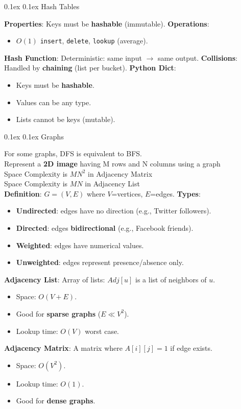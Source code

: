 \documentclass[8pt,landscape]{article}
\makeatletter
\renewcommand{\subsection}{\@startsection{subsection}{2}{0pt}%
    {0.1ex}%
    {0.1ex}%
    {\fontsize{8}{9}\bfseries\color{blue}}} %
\newcommand{\code}[1]{\textcolor{myred}{\texttt{#1}}}
\newcommand{\smalltext}[1]{%
  {\fontsize{8}{9}\selectfont\sloppy #1\par}%
}
\makeatother
\begin{document}
\begin{multicols}{3}
\subsection{Hash Tables}
\smalltext{
\textbf{Properties}: Keys must be \textbf{hashable} (immutable).
\textbf{Operations}:
\begin{itemize}[noitemsep, nolistsep, leftmargin=1em]
    \item $O(1)$ \code{insert}, \code{delete}, \code{lookup} (average).
\end{itemize}
\textbf{Hash Function}: Deterministic: same input $\to$ same output.
\textbf{Collisions}: Handled by \textbf{chaining} (list per bucket).
\textbf{Python Dict}:
\begin{itemize}[noitemsep, nolistsep, leftmargin=1em]
    \item Keys must be \textbf{hashable}.
    \item Values can be any type.
    \item Lists cannot be keys (mutable).
\end{itemize}
}

\subsection{Graphs}
\smalltext{
  For some graphs, DFS is equivalent to BFS. \\
  Represent a \textbf{2D image} having M rows and N columns using a graph \\
  Space Complexity is $MN^2$  in Adjacency Matrix\\
  Space Complexity is $MN$  in Adjacency List\\
\textbf{Definition}: $G=(V, E)$ where $V$=vertices, $E$=edges.
\textbf{Types}:
\begin{itemize}[noitemsep, nolistsep, leftmargin=1em]
    \item \textbf{Undirected}: edges have no direction (e.g., Twitter followers).
    \item \textbf{Directed}: edges \textbf{bidirectional} (e.g., Facebook friends).
    \item \textbf{Weighted}: edges have numerical values.
    \item \textbf{Unweighted}: edges represent presence/absence only.
\end{itemize}
\textbf{Adjacency List}: Array of lists: $Adj[u]$ is a list of neighbors of $u$.
\begin{itemize}[noitemsep, nolistsep, leftmargin=1em]
    \item Space: $O(V+E)$.
    \item Good for \textbf{sparse graphs} ($E \ll V^2$).
    \item Lookup time: $O(V)$ worst case.
\end{itemize}
\textbf{Adjacency Matrix}: A matrix where $A[i][j]=1$ if edge exists.
\begin{itemize}[noitemsep, nolistsep, leftmargin=1em]
    \item Space: $O(V^2)$.
    \item Lookup time: $O(1)$.
    \item Good for \textbf{dense graphs}.
\end{itemize}
}


\end{multicols}
\end{document}
